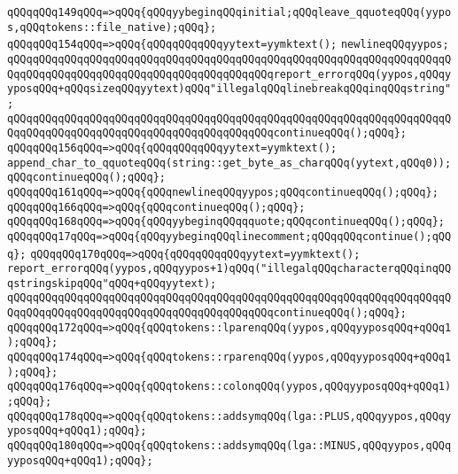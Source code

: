 \verb|qQQqqQQq149qQQq=>qQQq{qQQqyybeginqQQqinitial;qQQqleave_qquoteqQQq(yypos,qQQqtokens::file_native);qQQq};|\newline
\verb|qQQqqQQq154qQQq=>qQQq{qQQqqQQqqQQqyytext=yymktext();|\newline
\verb|newlineqQQqyypos;|\newline
\verb|qQQqqQQqqQQqqQQqqQQqqQQqqQQqqQQqqQQqqQQqqQQqqQQqqQQqqQQqqQQqqQQqqQQqqQQqqQQqqQQqqQQqqQQqqQQqqQQqqQQqqQQqqQQqqQQqreport_errorqQQq(yypos,qQQqyyposqQQq+qQQqsizeqQQqyytext)qQQq"illegalqQQqlinebreakqQQqinqQQqstring";|\newline
\verb|qQQqqQQqqQQqqQQqqQQqqQQqqQQqqQQqqQQqqQQqqQQqqQQqqQQqqQQqqQQqqQQqqQQqqQQqqQQqqQQqqQQqqQQqqQQqqQQqqQQqqQQqqQQqqQQqcontinueqQQq();qQQq};|\newline
\verb|qQQqqQQq156qQQq=>qQQq{qQQqqQQqqQQqyytext=yymktext();|\newline
\verb|append_char_to_qquoteqQQq(string::get_byte_as_charqQQq(yytext,qQQq0));qQQqcontinueqQQq();qQQq};|\newline
\verb|qQQqqQQq161qQQq=>qQQq{qQQqnewlineqQQqyypos;qQQqcontinueqQQq();qQQq};|\newline
\verb|qQQqqQQq166qQQq=>qQQq{qQQqcontinueqQQq();qQQq};|\newline
\verb|qQQqqQQq168qQQq=>qQQq{qQQqyybeginqQQqqquote;qQQqcontinueqQQq();qQQq};|\newline
\verb|qQQqqQQq17qQQq=>qQQq{qQQqyybeginqQQqlinecomment;qQQqqQQqcontinue();qQQq};|\newline
\verb|qQQqqQQq170qQQq=>qQQq{qQQqqQQqqQQqyytext=yymktext();|\newline
\verb|report_errorqQQq(yypos,qQQqyypos+1)qQQq("illegalqQQqcharacterqQQqinqQQqstringskipqQQq"qQQq+qQQqyytext);|\newline
\verb|qQQqqQQqqQQqqQQqqQQqqQQqqQQqqQQqqQQqqQQqqQQqqQQqqQQqqQQqqQQqqQQqqQQqqQQqqQQqqQQqqQQqqQQqqQQqqQQqqQQqqQQqqQQqqQQqcontinueqQQq();qQQq};|\newline
\verb|qQQqqQQq172qQQq=>qQQq{qQQqtokens::lparenqQQq(yypos,qQQqyyposqQQq+qQQq1);qQQq};|\newline
\verb|qQQqqQQq174qQQq=>qQQq{qQQqtokens::rparenqQQq(yypos,qQQqyyposqQQq+qQQq1);qQQq};|\newline
\verb|qQQqqQQq176qQQq=>qQQq{qQQqtokens::colonqQQq(yypos,qQQqyyposqQQq+qQQq1);qQQq};|\newline
\verb|qQQqqQQq178qQQq=>qQQq{qQQqtokens::addsymqQQq(lga::PLUS,qQQqyypos,qQQqyyposqQQq+qQQq1);qQQq};|\newline
\verb|qQQqqQQq180qQQq=>qQQq{qQQqtokens::addsymqQQq(lga::MINUS,qQQqyypos,qQQqyyposqQQq+qQQq1);qQQq};|\newline

